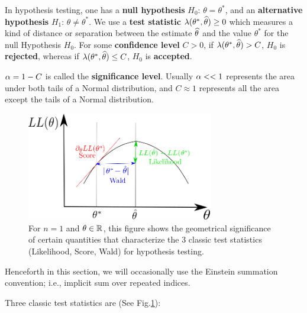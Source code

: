 In hypothesis testing, one has
 a {\bf null hypothesis}
$H_0$: $\theta=\theta^*$,
and an {\bf alternative hypothesis}
 $H_1$: $\theta\neq \theta^*$.
We use a {\bf test statistic}
$\lambda(\theta^*, {\widehat{\theta}})\geq 0$
which
measures a kind of
distance or separation between the
estimate ${\widehat{\theta}}$
and
the value $\theta^*$
for the null Hypothesis $H_0$.
For some {\bf confidence level} $C>0$,
if $\lambda(\theta^*, {\widehat{\theta}})> C$,
$H_0$ is {\bf rejected}, whereas
if $\lambda(\theta^*, {\widehat{\theta}})\leq C$,
$H_0$ is {\bf accepted}.


$\alpha=1-C$ is called the
{\bf significance level}.
Usually $\alpha<<1$
represents
the area under both
tails
of a Normal
distribution,
 and $C\approx 1$
represents
all the area except the tails of a
Normal distribution.

\begin{figure}[h!]
\centering
\includegraphics[width=3.2in]{conventions/classic-trio.png}
\caption{For $n=1$ and $\theta\in{ \mathbb{R}}$,
this figure shows the geometrical significance of
certain
quantities that
characterize the
3 classic test statistics
(Likelihood, Score, Wald)
for hypothesis testing.}
\label{fig-classic-trio}
\end{figure}

Henceforth in this section,
we will
occasionally  use the
Einstein summation
convention; i.e., implicit sum over
repeated indices.

Three classic test statistics
are (See Fig.\ref{fig-classic-trio}):

